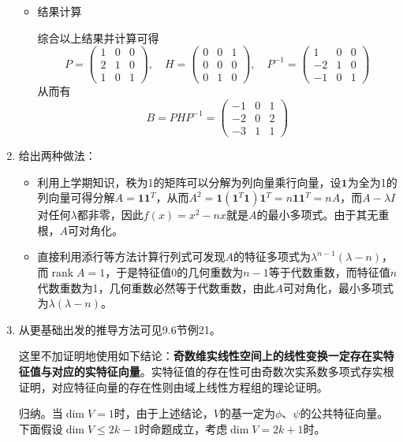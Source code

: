 \documentclass[a4paper,UTF8,fontset=windows,AutoFakeBold]{ctexart}
\DeclareMathOperator{\rank}{rank}
\newcommand*{\note}{\noindent *}
\begin{document}
\begin{enumerate}
\begin{itemize}
        \item 结果计算

        综合以上结果并计算可得
        $$P=\begin{pmatrix}1&0&0\\2&1&0\\1&0&1\end{pmatrix},\quad H=\begin{pmatrix}0&0&1\\0&0&0\\0&1&0\end{pmatrix},\quad P^{-1}=\begin{pmatrix}1&0&0\\-2&1&0\\-1&0&1\end{pmatrix}$$
        从而有
        $$B=PHP^{-1}=\begin{pmatrix}-1&0&1\\-2&0&2\\-3&1&1\end{pmatrix}$$
    \end{itemize}
    
    \item
    给出两种做法：
    \begin{itemize}
        \item 利用上学期知识，秩为1的矩阵可以分解为列向量乘行向量，设$\mathbf{1}$为全为1的列向量可得分解$A=\mathbf{1}\mathbf{1}^T$，从而$A^2=\mathbf{1}(\mathbf{1}^T\mathbf{1})\mathbf{1}^T=n\mathbf{1}\mathbf{1}^T=nA$，而$A-\lambda I$对任何$\lambda$都非零，因此$f(x)=x^2-nx$就是$A$的最小多项式。由于其无重根，$A$可对角化。
        \item 直接利用添行等方法计算行列式可发现$A$的特征多项式为$\lambda^{n-1}(\lambda-n)$，而$\rank A=1$，于是特征值0的几何重数为$n-1$等于代数重数，而特征值$n$代数重数为1，几何重数必然等于代数重数，由此$A$可对角化，最小多项式为$\lambda(\lambda-n)$。
    \end{itemize}
    
    \item
    \note 从更基础出发的推导方法可见9.6节例21。

    这里不加证明地使用如下结论：\textbf{奇数维实线性空间上的线性变换一定存在实特征值与对应的实特征向量}。实特征值的存在性可由奇数次实系数多项式存实根证明，对应特征向量的存在性则由域上线性方程组的理论证明。

    归纳。当$\dim V=1$时，由于上述结论，$V$的基一定为$\phi$、$\psi$的公共特征向量。下面假设$\dim V\le 2k-1$时命题成立，考虑$\dim V=2k+1$时。


\end{enumerate}
\end{document}
